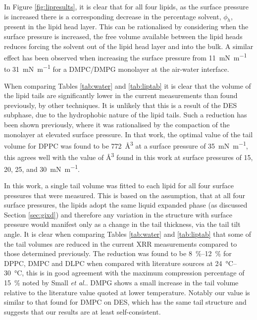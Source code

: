 \documentclass[%
 reprint,
 amsmath,amssymb,
 prl,
]{revtex4-1}
\begin{document}
In Figure \ref{fig:lipresults}, it is clear that for all four lipids, as the surface pressure is increased there is a corresponding decrease in the percentage solvent, $\phi_h$, present in the lipid head layer.
This can be rationalised by considering when the surface pressure is increased, the free volume available between the lipid heads reduces forcing the solvent out of the lipid head layer and into the bulk.
A similar effect has been observed when increasing the surface pressure from \SI{11}{\milli\newton\per\meter} to \SI{31}{\milli\newton\per\meter} for a DMPC/DMPG monolayer at the air-water interface\cite{Bayerl1990}.

When comparing Tables \ref{tab:water} and \ref{tab:liptab} it is clear that the volume of the lipid tails are significantly lower in the current measurements than found previously, by other techniques.
It is unlikely that this is a result of the DES subphase, due to the hydrophobic nature of the lipid tails.
Such a reduction has been shown previously\cite{Campbell2018}, where it was rationalised by the compaction of the monolayer at elevated surface pressure.
In that work, the optimal value of the tail volume for DPPC was found to be \SI{772}{\cubic\angstrom} at a surface pressure of \SI{35}{\milli\newton\per\meter}, this agrees well with the value of \si{\cubic\angstrom} found in this work at surface pressures of 15, 20, 25, and \SI{30}{\milli\newton\per\meter}.

In this work, a single tail volume was fitted to each lipid for all four surface pressures that were measured.
This is based on the assumption, that at all four surface pressures, the lipids adopt the same liquid expanded phase (as discussed Section \ref{sec:gixd}) and therefore any variation in the structure with surface pressure would manifest only as a change in the tail thickness, via the tail tilt angle.
It is clear when comparing Tables \ref{tab:water} and \ref{tab:liptab} that some of the tail volumes are reduced in the current XRR measurements compared to those determined previously.
The reduction was found to be \SIrange{8}{12}{\percent} for DPPC, DMPC and DLPC when compared with literature sources at \SIrange{24}{30}{\celsius}, this is in good agreement with the maximum compression percentage of \SI{15}{\percent} noted by Small \emph{et al.}\cite{Small1984}. DMPG shows a small increase in the tail volume relative to the literature value quoted at lower temperature.
Notably our value is similar to that found for DMPC on DES, which has the same tail structure and suggests that our results are at least self-consistent.
\end{document}
